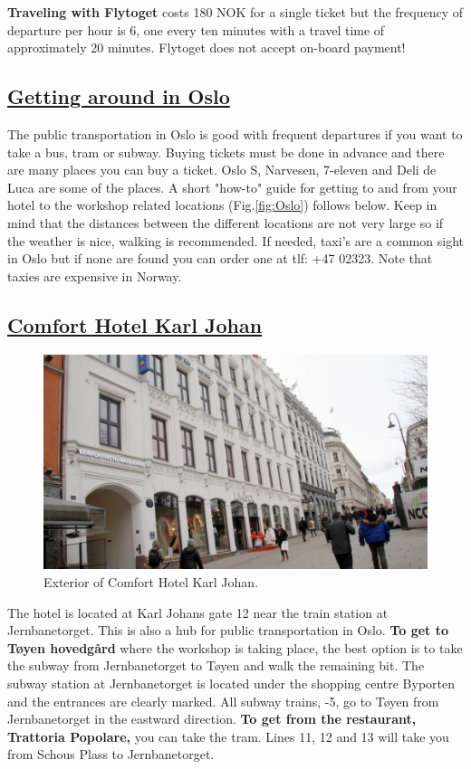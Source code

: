 \documentclass{article}
\begin{document}
\textbf{Traveling with Flytoget} costs 180 NOK for a single ticket
but the frequency of departure per hour is 6, one every
ten minutes with a travel time of approximately 20 minutes.
Flytoget does not accept on-board payment!


\subsection*{\underline{Getting around in Oslo}}

The public transportation in Oslo is good with frequent
departures if you want
to take a bus, tram or subway. Buying tickets must be
done in advance and there are many places you can buy a
ticket. Oslo S, Narvesen, 7-eleven and Deli de Luca are some of the places.
A short "how-to" guide for getting to and from your hotel
 to the workshop related
locations (Fig.\ref{fig:Oslo}) follows below. Keep in mind that
the distances
between the different locations are not very large so if the
weather is nice, walking is recommended. If needed, taxi's
are a common sight in Oslo but if none are found you can order one
at tlf: +47 02323. Note that taxies are expensive in Norway.


\subsection*{\underline{Comfort Hotel Karl Johan}}

\begin{figure}
\centering
\includegraphics[scale=0.2]{img/comfort_karl_johan.jpg}
\caption{\label{fig:frog1}Exterior of Comfort Hotel Karl Johan.}
\end{figure}
The hotel is located at Karl Johans gate 12 near
the train station at Jernbanetorget.
This is also
a hub for public transportation in Oslo. \textbf{To get to
Tøyen hovedgård} where the workshop is taking place,
the best option is to take the subway from Jernbanetorget
to Tøyen and walk the remaining bit. The subway station
at Jernbanetorget is located under the shopping centre
Byporten and the entrances are clearly marked.
All subway trains,
-5, go to Tøyen from
Jernbanetorget in the eastward direction. \textbf{To get from
the restaurant, Trattoria Popolare,} you can take the tram. Lines
11, 12 and 13 will take you from Schous Plass to Jernbanetorget.
\end{document}
